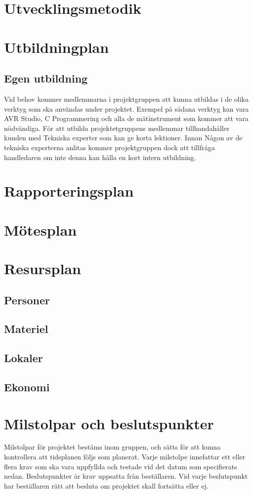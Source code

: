 \documentclass[a4paper,12pt]{article}
\begin{document}
\section{Utvecklingsmetodik}	%

\section{ Utbildningplan}	%
\subsection{Egen utbildning}
Vid behov kommer medlemmarna i projektgruppen att kunna utbildas i de olika verktyg som ska användas under projektet. Exempel på sådana verktyg kan vara AVR Studio, C Programmering och alla de mätinstrument som kommer att vara nödvändiga. För att utbilda projektetgruppens medlemmar tillhandahåller kunden med Tekniska experter som kan ge korta lektioner. Innan Någon av de tekniska experterna anlitas kommer projektgruppen dock att tillfråga handledaren om inte denna kan hålla en kort intern utbildning.

\section{Rapporteringsplan}

\section{Mötesplan}

\section{Resursplan}	%
\subsection{Personer}
\subsection{Materiel}
\subsection{Lokaler}
\subsection{Ekonomi}

\section{ Milstolpar och beslutspunkter} %
Milstolpar för projektet bestäms inom gruppen, och sätts för att kunna kontrollera att tidsplanen följs som planerat. Varje milstolpe innefattar ett eller flera krav som ska vara uppfyllda och testade vid det datum som specifierats nedan. Beslutspunkter är krav uppsatta från beställaren. Vid varje beslutspunkt har beställaren rätt att besluta om projektet skall fortsätta eller ej.
\end{document}
